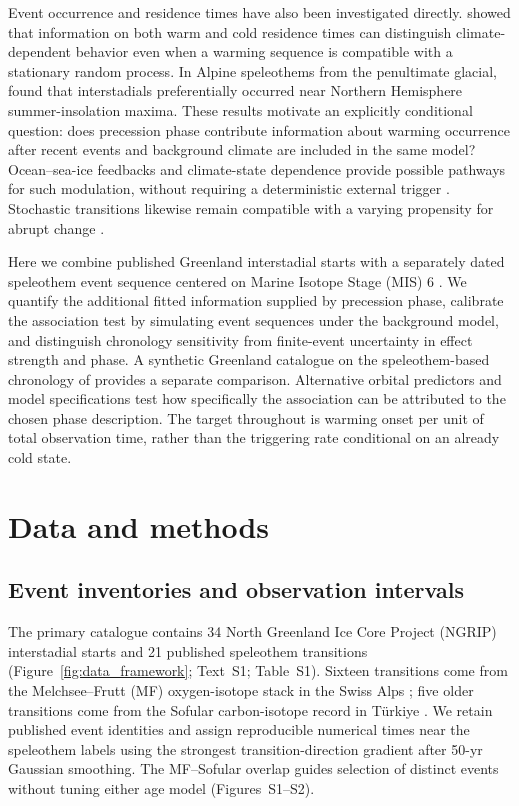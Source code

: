 \documentclass[11pt]{article}
\begin{document}
Event occurrence and residence times have also been investigated directly. \citet{lohmann2018random} showed that information on both warm and cold residence times can distinguish climate-dependent behavior even when a warming sequence is compatible with a stationary random process. In Alpine speleothems from the penultimate glacial, \citet{fohlmeister2023role} found that interstadials preferentially occurred near Northern Hemisphere summer-insolation maxima. These results motivate an explicitly conditional question: does precession phase contribute information about warming occurrence after recent events and background climate are included in the same model? Ocean--sea-ice feedbacks and climate-state dependence provide possible pathways for such modulation, without requiring a deterministic external trigger \citep{dokken2013dansgaard,vettoretti2022atmospheric}. Stochastic transitions likewise remain compatible with a varying propensity for abrupt change \citep{ditlevsen2005recurrence,kleppin2015stochastic}.

Here we combine published Greenland interstadial starts with a separately dated speleothem event sequence centered on Marine Isotope Stage (MIS) 6 \citep{rasmussen2014stratigraphic,fohlmeister2023role,held2024dansgaard}. We quantify the additional fitted information supplied by precession phase, calibrate the association test by simulating event sequences under the background model, and distinguish chronology sensitivity from finite-event uncertainty in effect strength and phase. A synthetic Greenland catalogue on the speleothem-based chronology of \citet{barker2011800} provides a separate comparison. Alternative orbital predictors and model specifications test how specifically the association can be attributed to the chosen phase description. The target throughout is warming onset per unit of total observation time, rather than the triggering rate conditional on an already cold state.

\section{Data and methods}
\subsection{Event inventories and observation intervals}
The primary catalogue contains 34 North Greenland Ice Core Project (NGRIP) interstadial starts \citep{rasmussen2014stratigraphic} and 21 published speleothem transitions (Figure~\ref{fig:data_framework}; Text~S1; Table~S1). Sixteen transitions come from the Melchsee--Frutt (MF) oxygen-isotope stack in the Swiss Alps \citep{fohlmeister2023role}; five older transitions come from the Sofular carbon-isotope record in T\"urkiye \citep{held2024dansgaard}. We retain published event identities and assign reproducible numerical times near the speleothem labels using the strongest transition-direction gradient after 50-yr Gaussian smoothing. The MF--Sofular overlap guides selection of distinct events without tuning either age model (Figures~S1--S2).
\end{document}

